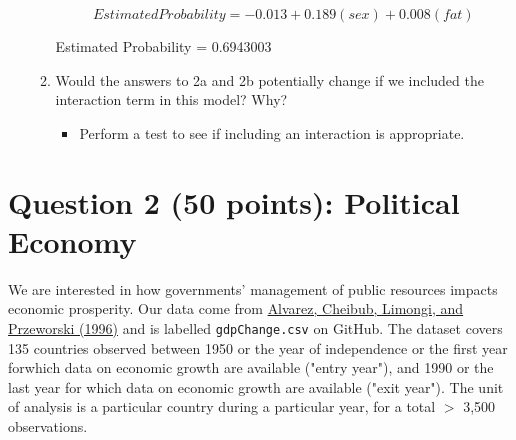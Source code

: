 \documentclass[12pt,letterpaper]{article}
\begin{document}
\begin{enumerate}
\begin{enumerate}
		\vspace{.5cm}
		  
		\vspace{.5cm}
		
\begin{equation}
Estimated Probability = -0.013 + 0.189(sex) + 0.008(fat)
\end{equation}	

Estimated Probability = 0.6943003	
		\item
		Would the answers to 2a and 2b potentially change if we included the interaction term in this model? Why? 
		\begin{itemize}
			\item Perform a test to see if including an interaction is appropriate.
		\end{itemize}
	
		
	\end{enumerate}
\end{enumerate}
\newpage


\section*{Question 2 (50 points): Political Economy}
\vspace{.25cm}
\noindent We are interested in how governments' management of public resources impacts economic prosperity. Our data come from \href{https://www.researchgate.net/profile/Adam_Przeworski/publication/240357392_Classifying_Political_Regimes/links/0deec532194849aefa000000/Classifying-Political-Regimes.pdf}{Alvarez, Cheibub, Limongi, and Przeworski (1996)} and is labelled \texttt{gdpChange.csv} on GitHub. The dataset covers 135 countries observed between 1950 or the year of independence or the first year forwhich data on economic growth are available ("entry year"), and 1990 or the last year for which data on economic growth are available ("exit year"). The unit of analysis is a particular country during a particular year, for a total $>$ 3,500 observations. 
\end{document}
